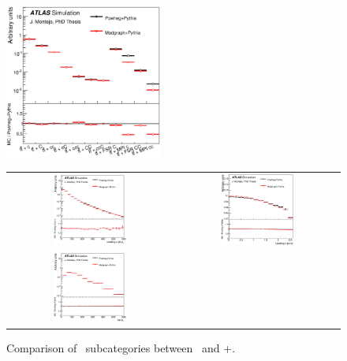 \begin{figure}[p]
\begin{center}
\includegraphics[width=0.46\textwidth]{Modeling/Figures/defaultcc_realHFcc_extHFtype_ttcc_norm.eps}
\caption{Comparison of \ttcc\ subcategories between \PP\ and \madgraph+\pythia.}
\label{fig:defaultcc_extHFtype_app}
\end{center}
\vspace{-20pt}
\begin{center}
\begin{tabular}{cc}
\includegraphics[width=0.46\textwidth]{Modeling/Figures/defaultcc_tt1cq_q1_pt_norm.eps} &
\includegraphics[width=0.46\textwidth]{Modeling/Figures/defaultcc_tt1cq_q1_eta_norm.eps} \\
\includegraphics[width=0.46\textwidth]{Modeling/Figures/defaultcc_tt1cq_top_pt_norm.eps} &

\end{tabular}
\end{center}
\end{figure}
